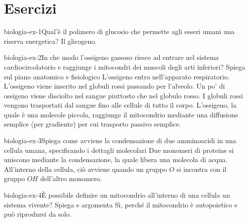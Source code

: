 \documentclass[preview]{standalone}
\begin{document}
\genpage

\section{Esercizi}

\begin{snippetexercise}{biologia-ex-1}{Qual'è il polimero di glucosio che permette agli esseri umani una riserva energetica?}
    Il glicogeno.
\end{snippetexercise}

\begin{snippetexercise}{biologia-ex-2}{In che modo l'ossigeno gassoso riesce ad entrare nel sistema cardiocircolatorio e raggiunge i mitocondri dei muscoli degli arti inferiori? Spiega sul piano anatomico e fisiologico}
    L'ossigeno entra nell'apparato respiratorio.
    L'ossigeno viene inserito nel globuli rossi passando per l'alveolo.
    Un po' di ossigeno viene disciolto nel sangue piuttosto che nel globulo rosso.
    I globuli rossi vengono trasportati dal sangue fino alle cellule di tutto il corpo.
    L'ossigeno, la quale è una molecole piccola, raggiunge il mitocondrio mediante una diffusione semplice (per gradiente) per cui trasporto passivo semplice.
\end{snippetexercise}

\begin{snippetexercise}{biologia-ex-3}{Spiega come avviene la condensazione di due amminoacidi in una cellula umana, specificando i dettagli molecolari}
    Due monomeri di proteine si uniscono mediante la condensazione, la quale libera una molecola di acqua.
    All'interno della cellula, ciò avviene quando un gruppo \(O\) si incontra con il gruppo \(OH\) dell'altro monomero.
\end{snippetexercise}

\begin{snippetexercise}{biologia-ex-4}{È possibile definire un mitocondrio all'interno di una cellula un sistema vivente? Spiega e argomenta}
    Sì, perché il mitocondrio è autopoietico e può riprodursi da solo.
\end{snippetexercise}
\end{document}
